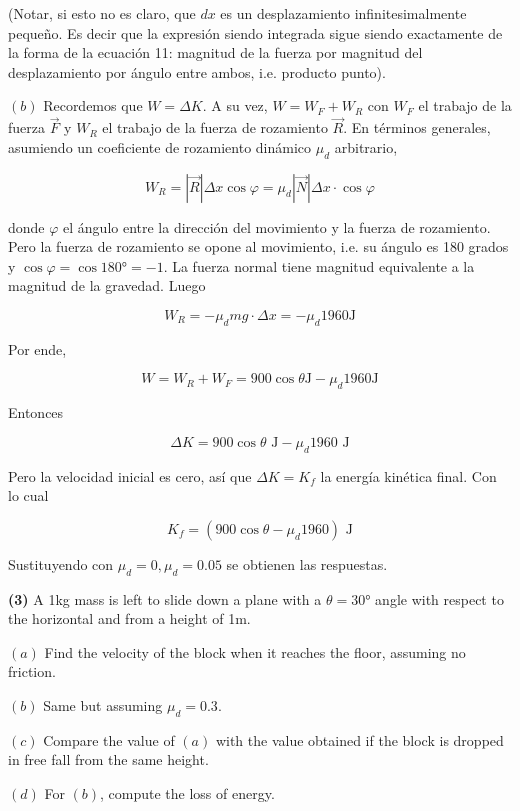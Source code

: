 \documentclass[12pt]{article}
\theoremstyle{definition}
\begin{document}
(Notar, si esto no es claro, que $dx$ es un desplazamiento infinitesimalmente
pequeño. Es decir que la expresión siendo integrada sigue siendo exactamente de
la forma de la ecuación 11: magnitud de la fuerza por magnitud del
desplazamiento por ángulo entre ambos, i.e. producto punto).

\pagebreak 

$(b)$ Recordemos que $W = \Delta K$. A su vez, $W = W_F + W_R$ con $W_F$ el
trabajo de la fuerza $\vec{F}$ y $W_R$ el trabajo de la fuerza de rozamiento
$\vec{R}$. En términos generales, asumiendo un coeficiente de rozamiento
dinámico $\mu_d$ arbitrario,

\begin{equation*}
    W_R = \left| \vec{R} \right| \Delta x \cos \varphi = \mu_d \left| \vec{N} \right|
    \Delta x \cdot \cos \varphi
\end{equation*}

donde $\varphi$ el ángulo entre la dirección del movimiento y la fuerza de
rozamiento. Pero la fuerza de rozamiento se opone al movimiento, i.e. su ángulo
es 180 grados y $\cos \varphi = \cos \ang{180} = -1$. La fuerza normal tiene
magnitud equivalente a la magnitud de la gravedad. Luego 

\begin{equation*}
    W_R = -\mu_d mg \cdot \Delta x = -\mu_d 1960 \text{J}
\end{equation*}

Por ende, 

\begin{equation*}
    W = W_R + W_F = 900 \cos \theta \text{J} - \mu_d 1960\text{J}
\end{equation*}

Entonces 

\begin{equation*}
    \Delta K = 900 \cos \theta \text{ J} - \mu_d 1960 \text{ J}
\end{equation*}

Pero la velocidad inicial es cero, así que $\Delta K = K_f$ la energía kinética
final. Con lo cual

\begin{equation*}
    K_f = ( 900\cos \theta - \mu_d 1960 ) \text{ J}
\end{equation*}

Sustituyendo con $\mu_d = 0, \mu_d = 0.05$ se obtienen las respuestas.


\begin{shaded}
    \textbf{(3)} A 1kg mass is left to slide down a plane with a $\theta =
    \ang{30}$ angle with respect to the horizontal and from a height of 1m. 

    $(a)$ Find the velocity of the block when it reaches the floor, assuming no
    friction.

    $(b)$ Same but assuming $\mu_d = 0.3$.

    $(c)$ Compare the value of $(a)$ with the value obtained if the block is
    dropped in free fall from the same height. 

    $(d)$ For $(b)$, compute the loss of energy.
\end{shaded}
\end{document}
